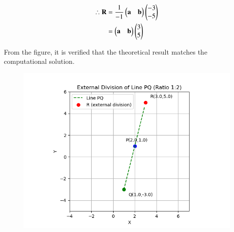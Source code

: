 \documentclass[journal]{IEEEtran}
\begin{document}
\begin{align}
    \therefore \mathbf{R}
    &= \frac{1}{-1}
       \begin{pmatrix}\mathbf{a} & \mathbf{b}\end{pmatrix}
       \begin{pmatrix}-3 \\ -5\end{pmatrix} \\
    &= \begin{pmatrix}\mathbf{a} & \mathbf{b}\end{pmatrix}
       \begin{pmatrix}3 \\ 5\end{pmatrix}
\end{align}

\newpage

From the figure, it is verified that the theoretical result matches the computational solution.  

\begin{figure}[h!]
    \centering
    \includegraphics[width=\columnwidth, keepaspectratio]{figs/section_graph.png}
    \label{fig:section_graph}
\end{figure}
\end{document}
